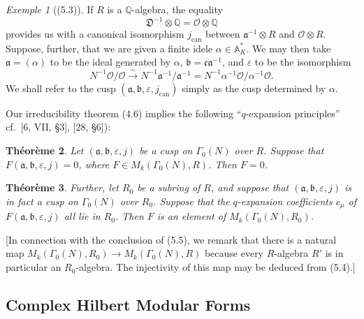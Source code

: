 \documentclass[12pt,a4paper]{article}
\theoremstyle{plain}
\newtheorem{theorem}{Th\'{e}or\`{e}me}[section]
\theoremstyle{definition}
\theoremstyle{remark}
\newtheorem{example}[theorem]{Exemple}
\newenvironment{namedtheorem}[1][]{%
  \renewcommand{\thetheorem}{#1}%
  \theoremstyle{plain}%
  \begin{theorem}%
}{\end{theorem}\renewcommand{\thetheorem}{\arabic{section}.\arabic{theorem}}}
\begin{document}
\begin{example}[(5.3)]
If $R$ is a $\mathbb{Q}$-algebra, the equality
\[
\mathfrak{D}^{-1} \otimes \mathbb{Q} = \mathcal{O} \otimes \mathbb{Q}
\]
provides us with a canonical isomorphism $j_{\mathrm{can}}$ between $\mathfrak{a}^{-1} \otimes R$ and $\mathcal{O} \otimes R$. Suppose, further, that we are given a finite idele $\alpha \in \mathbb{A}_K^*$. We may then take $\mathfrak{a} = (\alpha)$ to be the ideal generated by $\alpha$, $\mathfrak{b} = \mathfrak{c}\mathfrak{a}^{-1}$, and $\varepsilon$ to be the isomorphism
\[
N^{-1}\mathcal{O}/\mathcal{O} \xrightarrow{\sim} N^{-1}\mathfrak{a}^{-1}/\mathfrak{a}^{-1} = N^{-1}\alpha^{-1}\mathcal{O}/\alpha^{-1}\mathcal{O}.
\]
We shall refer to the cusp $(\mathfrak{a}, \mathfrak{b}, \varepsilon, j_{\mathrm{can}})$ simply as the cusp determined by $\alpha$.
\end{example}

Our irreducibility theorem (4.6) implies the following ``$q$-expansion principles'' cf.~[6, VII, \S3], [28, \S6]):

\begin{namedtheorem}[(5.4)]
Let $(\mathfrak{a}, \mathfrak{b}, \varepsilon, j)$ be a cusp on $\Gamma_0(N)$ over $R$. Suppose that $F(\mathfrak{a}, \mathfrak{b}, \varepsilon, j) = 0$, where $F \in M_k(\Gamma_0(N), R)$. Then $F = 0$.
\end{namedtheorem}

\begin{namedtheorem}[(5.5)]
Further, let $R_0$ be a subring of $R$, and suppose that $(\mathfrak{a}, \mathfrak{b}, \varepsilon, j)$ is in fact a cusp on $\Gamma_0(N)$ over $R_0$. Suppose that the $q$-expansion coefficients $c_\mu$ of $F(\mathfrak{a}, \mathfrak{b}, \varepsilon, j)$ all lie in $R_0$. Then $F$ is an element of $M_k(\Gamma_0(N), R_0)$.
\end{namedtheorem}

[In connection with the conclusion of (5.5), we remark that there is a natural map $M_k(\Gamma_0(N), R_0) \to M_k(\Gamma_0(N), R)$ because every $R$-algebra $R'$ is in particular an $R_0$-algebra. The injectivity of this map may be deduced from (5.4).]

\subsection*{Complex Hilbert Modular Forms}
\end{document}
